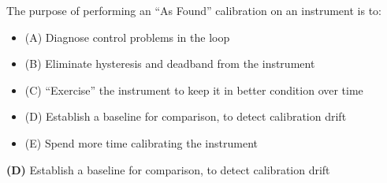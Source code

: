 

The purpose of performing an ``As Found'' calibration on an instrument is to:

\begin{itemize}
\item{(A)} Diagnose control problems in the loop
\vskip 5pt 
\item{(B)} Eliminate hysteresis and deadband from the instrument
\vskip 5pt 
\item{(C)} ``Exercise'' the instrument to keep it in better condition over time
\vskip 5pt 
\item{(D)} Establish a baseline for comparison, to detect calibration drift
\vskip 5pt 
\item{(E)} Spend more time calibrating the instrument
\end{itemize}







{\bf (D)} Establish a baseline for comparison, to detect calibration drift
 









